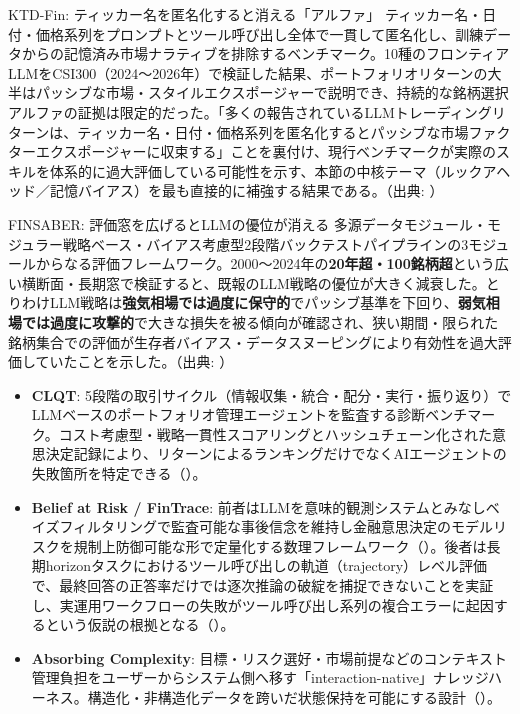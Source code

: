 \begin{casestudy}{KTD-Fin: ティッカー名を匿名化すると消える「アルファ」}
ティッカー名・日付・価格系列をプロンプトとツール呼び出し全体で一貫して匿名化し、訓練データからの記憶済み市場ナラティブを排除するベンチマーク。10種のフロンティアLLMをCSI300（2024〜2026年）で検証した結果、ポートフォリオリターンの大半はパッシブな市場・スタイルエクスポージャーで説明でき、持続的な銘柄選択アルファの証拠は限定的だった。「多くの報告されているLLMトレーディングリターンは、ティッカー名・日付・価格系列を匿名化するとパッシブな市場ファクターエクスポージャーに収束する」ことを裏付け、現行ベンチマークが実際のスキルを体系的に過大評価している可能性を示す、本節の中核テーマ（ルックアヘッド／記憶バイアス）を最も直接的に補強する結果である。（出典: \cite{fromknowingtodoing2026}）
\end{casestudy}

\begin{casestudy}{FINSABER: 評価窓を広げるとLLMの優位が消える}
多源データモジュール・モジュラー戦略ベース・バイアス考慮型2段階バックテストパイプラインの3モジュールからなる評価フレームワーク。2000〜2024年の\textbf{20年超・100銘柄超}という広い横断面・長期窓で検証すると、既報のLLM戦略の優位が大きく減衰した。とりわけLLM戦略は\textbf{強気相場では過度に保守的}でパッシブ基準を下回り、\textbf{弱気相場では過度に攻撃的}で大きな損失を被る傾向が確認され、狭い期間・限られた銘柄集合での評価が生存者バイアス・データスヌーピングにより有効性を過大評価していたことを示した。（出典: \cite{x04finsaber2025}）
\end{casestudy}

\begin{itemize}
  \item \textbf{CLQT}: 5段階の取引サイクル（情報収集・統合・配分・実行・振り返り）でLLMベースのポートフォリオ管理エージェントを監査する診断ベンチマーク。コスト考慮型・戦略一貫性スコアリングとハッシュチェーン化された意思決定記録により、リターンによるランキングだけでなくAIエージェントの失敗箇所を特定できる（\cite{clqt2026}）。
  \item \textbf{Belief at Risk / FinTrace}: 前者はLLMを意味的観測システムとみなしベイズフィルタリングで監査可能な事後信念を維持し金融意思決定のモデルリスクを規制上防御可能な形で定量化する数理フレームワーク（\cite{beliefatrisk2026}）。後者は長期horizonタスクにおけるツール呼び出しの軌道（trajectory）レベル評価で、最終回答の正答率だけでは逐次推論の破綻を捕捉できないことを実証し、実運用ワークフローの失敗がツール呼び出し系列の複合エラーに起因するという仮説の根拠となる（\cite{fintrace2026}）。
  \item \textbf{Absorbing Complexity}: 目標・リスク選好・市場前提などのコンテキスト管理負担をユーザーからシステム側へ移す「interaction-native」ナレッジハーネス。構造化・非構造化データを跨いだ状態保持を可能にする設計（\cite{absorbingcomplexity2026}）。
\end{itemize}

